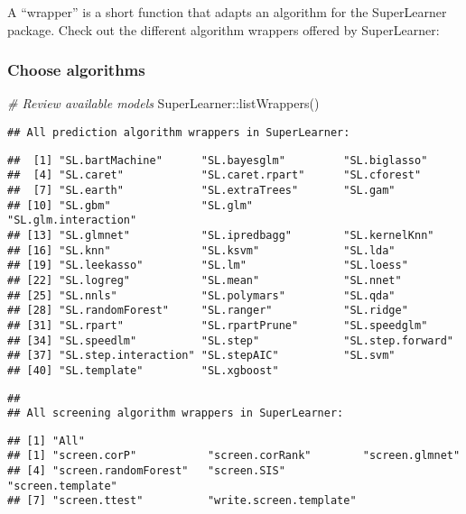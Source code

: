 \documentclass[
]{book}
\newenvironment{Shaded}{\begin{snugshade}}{\end{snugshade}}
\newcommand{\CommentTok}[1]{\textcolor[rgb]{0.56,0.35,0.01}{\textit{#1}}}
\newcommand{\FunctionTok}[1]{\textcolor[rgb]{0.00,0.00,0.00}{#1}}
\newcommand{\NormalTok}[1]{#1}
\newcommand{\SpecialCharTok}[1]{\textcolor[rgb]{0.00,0.00,0.00}{#1}}
\begin{document}
A ``wrapper'' is a short function that adapts an algorithm for the SuperLearner package. Check out the different algorithm wrappers offered by SuperLearner:

\hypertarget{choose-algorithms}{%
\subsubsection{Choose algorithms}\label{choose-algorithms}}

\begin{Shaded}
\begin{Highlighting}[]
\CommentTok{\# Review available models }
\NormalTok{SuperLearner}\SpecialCharTok{::}\FunctionTok{listWrappers}\NormalTok{()}
\end{Highlighting}
\end{Shaded}

\begin{verbatim}
## All prediction algorithm wrappers in SuperLearner:
\end{verbatim}

\begin{verbatim}
##  [1] "SL.bartMachine"      "SL.bayesglm"         "SL.biglasso"        
##  [4] "SL.caret"            "SL.caret.rpart"      "SL.cforest"         
##  [7] "SL.earth"            "SL.extraTrees"       "SL.gam"             
## [10] "SL.gbm"              "SL.glm"              "SL.glm.interaction" 
## [13] "SL.glmnet"           "SL.ipredbagg"        "SL.kernelKnn"       
## [16] "SL.knn"              "SL.ksvm"             "SL.lda"             
## [19] "SL.leekasso"         "SL.lm"               "SL.loess"           
## [22] "SL.logreg"           "SL.mean"             "SL.nnet"            
## [25] "SL.nnls"             "SL.polymars"         "SL.qda"             
## [28] "SL.randomForest"     "SL.ranger"           "SL.ridge"           
## [31] "SL.rpart"            "SL.rpartPrune"       "SL.speedglm"        
## [34] "SL.speedlm"          "SL.step"             "SL.step.forward"    
## [37] "SL.step.interaction" "SL.stepAIC"          "SL.svm"             
## [40] "SL.template"         "SL.xgboost"
\end{verbatim}

\begin{verbatim}
## 
## All screening algorithm wrappers in SuperLearner:
\end{verbatim}

\begin{verbatim}
## [1] "All"
## [1] "screen.corP"           "screen.corRank"        "screen.glmnet"        
## [4] "screen.randomForest"   "screen.SIS"            "screen.template"      
## [7] "screen.ttest"          "write.screen.template"
\end{verbatim}
\end{document}

